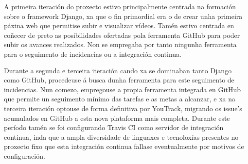 A primeira iteración do proxecto estivo principalmente centrada na formación sobre o framework
Django, xa que o fin primordial era o de crear unha primeira páxina web que permitise subir e 
visualizar vídeos. Tamén estivo centrada en coñecer de preto as posibilidades ofertadas pola
ferramenta GitHub para poder subir os avances realizados. Non se empregaba por tanto ningunha
ferramenta para o seguimento de incidencias ou a integración continua.

Durante a segunda e terceira iteración cando xa se dominaban tanto Django como GitHub, 
procedeuse á busca dunha ferramenta para este seguimento de incidencias. Nun comezo, empregouse
a propia ferramenta integrada en GitHub que permite un seguimento mínimo das tarefas e as metas
a alcanzar, e xa na terceira iteración optouse de forma definitiva por YouTrack, migrando os 
issue's acumulados en GitHub a esta nova plataforma mais completa. Durante este período tamén se
foi configurando Travis CI como servidor de integración continua, inda que a ampla diversidade
de linguaxes e tecnoloxías presentes no proxecto fixo que esta integración continua fallase 
eventualmente por motivos de configuración.

